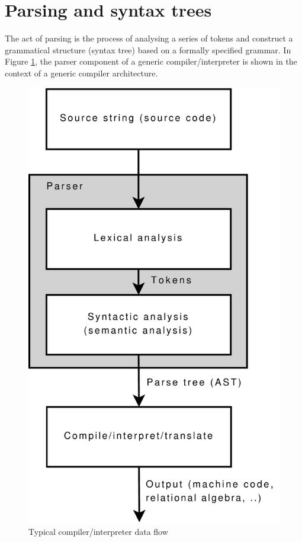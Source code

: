 \section{Parsing and syntax trees}
\label{sect:parser_and_syntaxtrees}
The act of parsing is the process of analysing a series of tokens and construct
a grammatical structure (syntax tree) based on a formally specified grammar. In
Figure \ref{figure:parser:overview}, the parser component of a generic
compiler/interpreter is shown in the context of a generic compiler
architecture.

\begin{figure}[h]
  \centering
    \includegraphics[scale=0.40]{diagrams/parser_overview}
  \caption{Typical compiler/interpreter data flow}
  \label{figure:parser:overview}
\end{figure}

